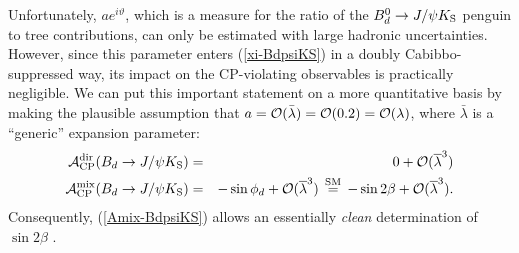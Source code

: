 \documentclass[11pt]{cernrep}
\begin{document}
Unfortunately, $a e^{i\vartheta}$, which is a measure for the ratio of the
$B_d^0\to J/\psi K_{\rm S}$ penguin to tree contributions,
can only be estimated with large hadronic uncertainties. However, since 
this parameter enters (\ref{xi-BdpsiKS}) in a doubly Cabibbo-suppressed way, its 
impact on the CP-violating observables is practically negligible. We can put 
this important statement on a more quantitative basis by making the plausible
assumption that $a={\cal O}(\bar\lambda)={\cal O}(0.2)={\cal O}(\lambda)$,
where $\bar\lambda$ is a ``generic'' expansion parameter:
\begin{eqnarray}
{\cal A}^{\mbox{{\scriptsize dir}}}_{\mbox{{\scriptsize
CP}}}(B_d\to J/\psi K_{\mbox{{\scriptsize S}}})&=&0+
{\cal O}(\overline{\lambda}^3)\label{Adir-BdpsiKS}\\
{\cal A}^{\mbox{{\scriptsize mix}}}_{\mbox{{\scriptsize
CP}}}(B_d\to J/\psi K_{\mbox{{\scriptsize S}}})&=&-\sin\phi_d +
{\cal O}(\overline{\lambda}^3) \, \stackrel{\rm SM}{=} \, -\sin2\beta+
{\cal O}(\overline{\lambda}^3).\label{Amix-BdpsiKS}
\end{eqnarray}
Consequently, (\ref{Amix-BdpsiKS}) allows an essentially {\it clean}
determination of $\sin2\beta$ \cite{bisa}.

%
%
%
\end{document}
